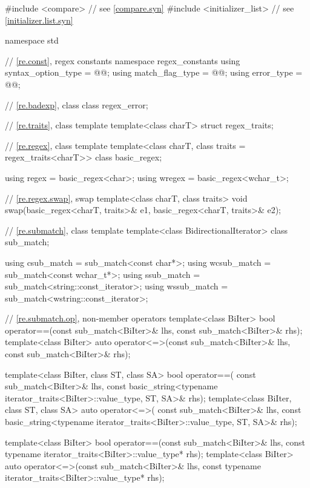 %
%
%
%
\begin{codeblock}
#include <compare>              // see \ref{compare.syn}
#include <initializer_list>     // see \ref{initializer.list.syn}

namespace std {
  // \ref{re.const}, regex constants
  namespace regex_constants {
    using syntax_option_type = @@;
    using match_flag_type = @@;
    using error_type = @@;
  }

  // \ref{re.badexp}, class 
  class regex_error;

  // \ref{re.traits}, class template 
  template<class charT> struct regex_traits;

  // \ref{re.regex}, class template 
  template<class charT, class traits = regex_traits<charT>> class basic_regex;

  using regex  = basic_regex<char>;
  using wregex = basic_regex<wchar_t>;

  // \ref{re.regex.swap},  swap
  template<class charT, class traits>
    void swap(basic_regex<charT, traits>& e1, basic_regex<charT, traits>& e2);

  // \ref{re.submatch}, class template 
  template<class BidirectionalIterator>
    class sub_match;

  using csub_match  = sub_match<const char*>;
  using wcsub_match = sub_match<const wchar_t*>;
  using ssub_match  = sub_match<string::const_iterator>;
  using wssub_match = sub_match<wstring::const_iterator>;

  // \ref{re.submatch.op},  non-member operators
  template<class BiIter>
    bool operator==(const sub_match<BiIter>& lhs, const sub_match<BiIter>& rhs);
  template<class BiIter>
    auto operator<=>(const sub_match<BiIter>& lhs, const sub_match<BiIter>& rhs);

  template<class BiIter, class ST, class SA>
    bool operator==(
      const sub_match<BiIter>& lhs,
      const basic_string<typename iterator_traits<BiIter>::value_type, ST, SA>& rhs);
  template<class BiIter, class ST, class SA>
    auto operator<=>(
      const sub_match<BiIter>& lhs,
      const basic_string<typename iterator_traits<BiIter>::value_type, ST, SA>& rhs);

  template<class BiIter>
    bool operator==(const sub_match<BiIter>& lhs,
                    const typename iterator_traits<BiIter>::value_type* rhs);
  template<class BiIter>
    auto operator<=>(const sub_match<BiIter>& lhs,
                     const typename iterator_traits<BiIter>::value_type* rhs);

}
\end{codeblock}
